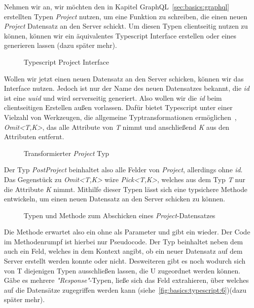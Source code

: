 Nehmen wir an, wir möchten den in Kapitel GraphQL~\ref{sec:basics:graphql} erstellten Typen \emph{Project} nutzen,
um eine Funktion zu schreiben, die einen neuen \emph{Project} Datensatz an den Server schickt. Um diesen Typen clientseitig nutzen zu können,
können wir ein äquivalentes Typescript Interface erstellen oder eines generieren lassen (dazu später mehr).

\begin{figure}[h]
    
    \caption{Typescript Project Interface}
    \label{fig:basics:typescript:3}
\end{figure}

Wollen wir jetzt einen neuen Datensatz an den Server schicken, können wir das Interface nutzen. Jedoch ist nur der Name des neuen Datensatzes bekannt,
die \emph{id} ist eine \emph{uuid} und wird serverseitig generiert. Also wollen wir die \emph{id} beim clientseitigen Erstellen außen vorlassen.
Dafür bietet Typescript unter einer Vielzahl von Werkzeugen, die allgemeine Typtransformationen ermöglichen~\cite{typescript-utility-types},
\emph{Omit<T,K>}, das alle Attribute von \emph{T} nimmt und anschließend \emph{K} aus den Attributen entfernt.

\begin{figure}[h]
    
    \caption{Transformierter \emph{Project} Typ}
    \label{fig:basics:typescript:4}
\end{figure}

Der Typ \emph{PostProject} beinhaltet also alle Felder von \emph{Project}, allerdings ohne \emph{id}. Das Gegenstück zu \emph{Omit<T,K>} wäre \emph{Pick<T,K>},
welches aus dem Typ \emph{T} nur die Attribute \emph{K} nimmt. Mithilfe dieser Typen lässt sich eine typsichere Methode entwickeln,
um einen neuen Datensatz an den Server schicken zu können.

\begin{figure}[h]
    
    \caption{Typen und Methode zum Abschicken eines \emph{Project}-Datensatzes}
    \label{fig:basics:typescript:5}
\end{figure}

Die Methode  erwartet also ein  ohne  als Parameter und gibt ein  wieder.
Der Code im Methodenrumpf ist hierbei nur Pseudocode. Der Typ  beinhaltet neben dem  auch ein  Feld,
welches in dem Kontext angibt, ob ein neuer Datensatz auf dem Server erstellt werden konnte oder nicht.
Desweiteren gibt es noch  wodurch sich von T diejenigen Typen ausschließen lassen,
die U zugeordnet werden können. Gäbe es mehrere \emph{"Response"}-Typen, ließe sich das Feld extrahieren,
über welches auf die Datensätze zugegriffen werden kann (siehe~\ref{fig:basics:typescript:6})(dazu später mehr).

